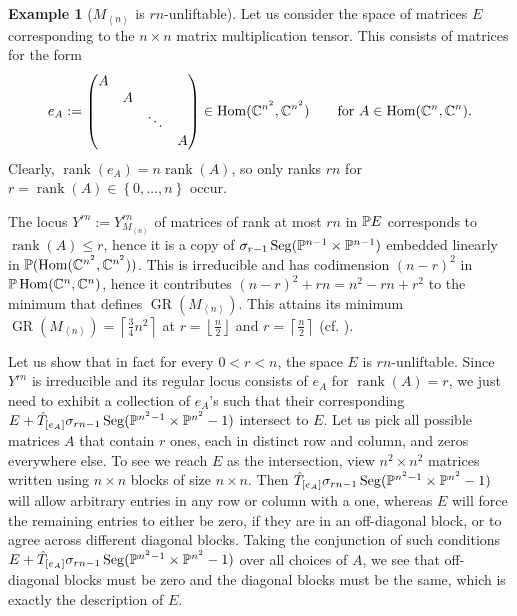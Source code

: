 \documentclass[a4paper,10pt]{article}
\def\floor#1{\left\lfloor#1\right\rfloor}
\def\ceil#1{\left\lceil#1\right\rceil}
\def\set#1{\left\{#1\right\}}
\def\gener#1{\left\langle#1\right\rangle}
\def\mtrx#1{\begin{pmatrix}#1\end{pmatrix}}
\DeclareMathOperator{\Hom}{Hom}\let\hom\Hom
\DeclareMathOperator{\rank}{rank}\let\rk\rank
\DeclareMathOperator{\Seg}{Seg}
\DeclareMathOperator{\GR}{GR}
\theoremstyle{definition}
\newtheorem{example}[theorem]{Example}
\theoremstyle{remark}
\begin{document}
\begin{example}[$M_{\gener n}$ is $rn$-unliftable]
    Let us consider the space of matrices $E$ corresponding to the $n\times n$ matrix multiplication tensor. This consists of matrices for the form
    \[
        e_A := \mtrx{A&&&\\&A&&\\&&\ddots&\\&&&A} \in \Hom(\ce^{n^2}, \ce^{n^2})\qquad \text{for $A\in\Hom(\ce^n, \ce^n)$.}
    \]
    Clearly, $\rank(e_A) = n \rank(A)$, so only ranks $rn$ for $r=\rank(A)\in\set{0,\dots,n}$ occur.

    The locus $Y^{rn}:=Y^{rn}_{M_{\gener n}}$ of matrices of rank at most $rn$ in $\pe E$ corresponds to $\rank(A)\leq r$, hence it is a copy of $\sigma_{r-1}\Seg(\pe^{n-1}\times\pe^{n-1})$ embedded linearly in $\pe(\Hom(\ce^{n^2}, \ce^{n^2}))$. This is irreducible and has codimension $(n-r)^2$ in $\pe\Hom(\ce^n,\ce^n)$, hence it contributes $(n-r)^2+rn = n^2-rn+r^2$ to the minimum that defines $\GR(M_{\gener n})$. This attains its minimum $\GR(M_{\gener n})=\ceil{\frac34n^2}$ at $r=\floor{\frac n2}$ and $r=\ceil{\frac n2}$ (cf. \cite[Theorem 6.1]{kopparty-moshkovitz-zuiddam}).

    Let us show that in fact for every $0<r<n$, the space $E$ is $rn$-unliftable. Since $Y^{rn}$ is irreducible and its regular locus consists of $e_A$ for $\rank(A)=r$, we just need to exhibit a collection of $e_A$'s such that their corresponding $E+\hat T_{[e_A]}\sigma_{rn-1}\Seg(\pe^{n^2-1}\times\pe^{n^2}-1)$ intersect to $E$. Let us pick all possible matrices $A$ that contain $r$ ones, each in distinct row and column, and zeros everywhere else. To see we reach $E$ as the intersection, view $n^2\times n^2$ matrices written using $n\times n$ blocks of size $n\times n$.
    Then $\hat T_{[e_A]}\sigma_{rn-1}\Seg(\pe^{n^2-1}\times\pe^{n^2}-1)$ will allow arbitrary entries in any row or column with a one, whereas $E$ will force the remaining entries to either be zero, if they are in an off-diagonal block, or to agree across different diagonal blocks. Taking the conjunction of such conditions $E+\hat T_{[e_A]}\sigma_{rn-1}\Seg(\pe^{n^2-1}\times\pe^{n^2}-1)$ over all choices of $A$, we see that off-diagonal blocks must be zero and the diagonal blocks must be the same, which is exactly the description of $E$.


\end{example}
\end{document}
